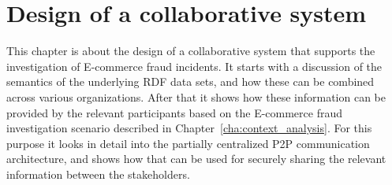 
\chapter{Design of a collaborative system} %
\label{cha:system_design}

This chapter is about the design of a collaborative system that supports the investigation of \gls{E-commerce} fraud incidents. It starts with a discussion of the semantics of the underlying \gls{RDF} data sets, and how these can be combined across various organizations. After that it shows how these information can be provided by the relevant participants based on the \gls{E-commerce} fraud investigation scenario described in Chapter~\ref{cha:context_analysis}. For this purpose it looks in detail into the partially centralized \gls{P2P} communication architecture, and shows how that can be used for securely sharing the relevant information between the stakeholders.







